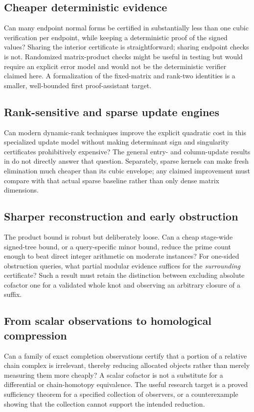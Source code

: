 \documentclass[11pt,letterpaper]{article}
\theoremstyle{definition}\newtheorem{definition}[theorem]{Definition}
\theoremstyle{remark}\newtheorem{remark}[theorem]{Remark}
\begin{document}
\subsection{Cheaper deterministic evidence}
Can many endpoint normal forms be certified in substantially less than one cubic verification per endpoint, while keeping a deterministic proof of the signed values? Sharing the interior certificate is straightforward; sharing endpoint checks is not. Randomized matrix-product checks might be useful in testing but would require an explicit error model and would not be the deterministic verifier claimed here. A formalization of the fixed-matrix and rank-two identities is a smaller, well-bounded first proof-assistant target.

\subsection{Rank-sensitive and sparse update engines}
Can modern dynamic-rank techniques improve the explicit quadratic cost in this specialized update model without making determinant sign and singularity certificates prohibitively expensive? The general entry- and column-update results in \cite{dynamicrank} do not directly answer that question. Separately, sparse kernels can make fresh elimination much cheaper than its cubic envelope; any claimed improvement must compare with that actual sparse baseline rather than only dense matrix dimensions.

\subsection{Sharper reconstruction and early obstruction}
The product bound is robust but deliberately loose. Can a cheap stage-wide signed-tree bound, or a query-specific minor bound, reduce the prime count enough to beat direct integer arithmetic on moderate instances? For one-sided obstruction queries, what partial modular evidence suffices for the \emph{surrounding} certificate? Such a result must retain the distinction between excluding absolute cofactor one for a validated whole knot and observing an arbitrary closure of a suffix.

\subsection{From scalar observations to homological compression}
Can a family of exact completion observations certify that a portion of a relative chain complex is irrelevant, thereby reducing allocated objects rather than merely measuring them more cheaply? A scalar cofactor is not a substitute for a differential or chain-homotopy equivalence. The useful research target is a proved sufficiency theorem for a specified collection of observers, or a counterexample showing that the collection cannot support the intended reduction.
\end{document}
